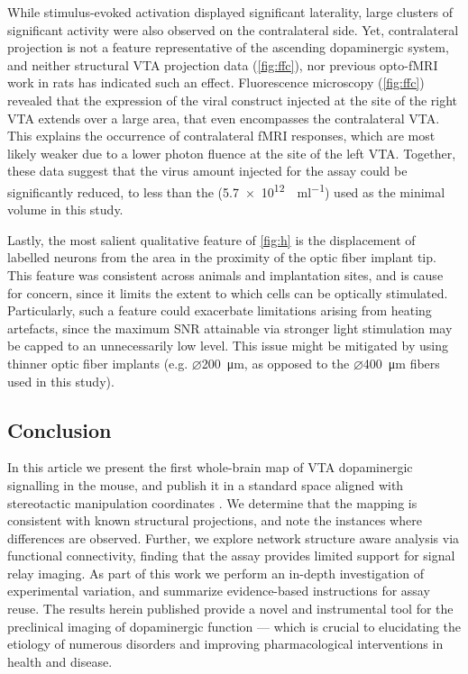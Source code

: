 While stimulus-evoked activation displayed significant laterality, large clusters of significant activity were also observed on the contralateral side.
Yet, contralateral projection is not a feature representative of the ascending dopaminergic system, and neither structural VTA projection data (\cref{fig:ffc}), nor previous opto-fMRI work in rats \cite{Lohani2016} has indicated such an effect.
Fluorescence microscopy (\cref{fig:ffc}) revealed that the expression of the viral construct injected at the site of the right VTA extends over a large area, that even encompasses the contralateral VTA.
This explains the occurrence of contralateral fMRI responses, which are most likely weaker due to a lower photon fluence at the site of the left VTA.
Together, these data suggest that the virus amount injected for the assay could be significantly reduced, to less than the
(\SI{5.7e12}{\vg\per\milli\litre})
used as the minimal volume in this study.

Lastly, the most salient qualitative feature of \cref{fig:h} is the displacement of labelled neurons from the area in the proximity of the optic fiber implant tip.
This feature was consistent across animals and implantation sites, and is cause for concern, since it limits the extent to which cells can be optically stimulated.
Particularly, such a feature could exacerbate limitations arising from heating artefacts, since the maximum SNR attainable via stronger light stimulation may be capped to an unnecessarily low level.
This issue might be mitigated by using thinner optic fiber implants (e.g. $\diameter$\SI{200}{\micro\meter}, as opposed to the $\diameter$\SI{400}{\micro\meter} fibers used in this study).

\subsection{Conclusion}

In this article we present the first whole-brain map of VTA dopaminergic signalling in the mouse, and publish it in a standard space aligned with stereotactic manipulation coordinates \cite{me}.
We determine that the mapping is consistent with known structural projections, and note the instances where differences are observed.
Further, we explore network structure aware analysis via functional connectivity, finding that the assay provides limited support for signal relay imaging.
As part of this work we perform an in-depth investigation of experimental variation, and summarize evidence-based instructions for assay reuse.
The results herein published provide a novel and instrumental tool for the preclinical imaging of dopaminergic function --- which is crucial to elucidating the etiology of numerous disorders and improving pharmacological interventions in health and disease.
